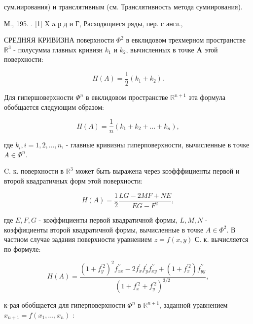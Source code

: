 \documentclass[10pt]{article}
\begin{document}
сум.иирования) и транслятивным (см. Транслятивность метода сумиирования).



М., 195. . [1] X a р д и Г, Расходящиеся ряды, пер. с англ.,



СРЕДНЯЯ КРИВИЗНА поверхности $\Phi^{2}$ в евклидовом трехмерном пространстве $\mathbb{R}^{3}$ - полусумма главных кривизн $k_{1}$ и $k_{2}$, вычисленных в точке $\boldsymbol{A}$ этой поверхности:



\[

H(A)=\frac{1}{2}\left(k_{1}+k_{2}\right) .

\]



Для гипершоверхности $\Phi^{n}$ в евклидовом пространстве $\mathbb{R}^{n+1}$ эта формула обобщается следующим образом:



\[

H(A)=\frac{1}{n}\left(k_{1}+k_{2}+\ldots+k_{n}\right),

\]



где $k_{i}, i=1,2, \ldots, n$, - главные кривизны гиперповерхности, вычисленные в точке $A \in \Phi^{n}$.



C. к. поверхности в $\mathbb{R}^{3}$ может быть выражена через коэфффициенты первой и второй квадратичных форм этой поверхности:



\[

H(A)=\frac{1}{2} \frac{L G-2 M F+N E}{E G-F^{2}},

\]



где $E, F, G$ - коәффициенты первой квадратичной формы, $L, M, N$ - коэффициенты второй квадратичной формы, вычисленные в точке $A \in \Phi^{2}$. В частном случае задания поверхности уравнением $z=f(x, y)$ С. к. вычисляется по формуле:



\[

H(A)=\frac{\left(1+f_{y}^{\prime 2}\right)^{2} f_{x x}^{\prime \prime}-2 f_{x}^{\prime} f_{y}^{\prime} f_{x y}^{\prime \prime}+\left(1+f_{x}^{\prime 2}\right) f_{y y}^{\prime \prime}}{\left(1+f_{x}^{\prime 2}+f_{y}^{\prime 2}\right)^{3 / 2}},

\]



к-рая обобщается для гиперповерхности $\Phi^{n}$ в $\mathbb{R}^{n+1}$, заданной уравнением $x_{n+1}=f\left(x_{1}, \ldots, x_{n}\right)$ :
\end{document}
